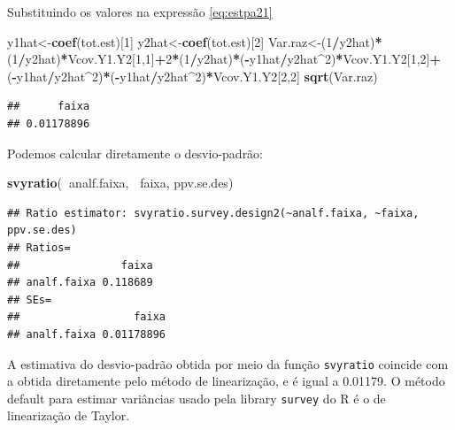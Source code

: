 \documentclass[]{book}
\newenvironment{Shaded}{\begin{snugshade}}{\end{snugshade}}
\newcommand{\KeywordTok}[1]{\textcolor[rgb]{0.13,0.29,0.53}{\textbf{#1}}}
\newcommand{\DecValTok}[1]{\textcolor[rgb]{0.00,0.00,0.81}{#1}}
\newcommand{\OperatorTok}[1]{\textcolor[rgb]{0.81,0.36,0.00}{\textbf{#1}}}
\newcommand{\NormalTok}[1]{#1}
\theoremstyle{definition}
\theoremstyle{definition}
\theoremstyle{definition}
\theoremstyle{remark}
\begin{document}
Substituindo os valores na expressão \eqref{eq:estpa21}

\begin{Shaded}
\begin{Highlighting}[]
\NormalTok{y1hat<-}\KeywordTok{coef}\NormalTok{(tot.est)[}\DecValTok{1}\NormalTok{]}
\NormalTok{y2hat<-}\KeywordTok{coef}\NormalTok{(tot.est)[}\DecValTok{2}\NormalTok{]}
\NormalTok{Var.raz<-(}\DecValTok{1}\OperatorTok{/}\NormalTok{y2hat)}\OperatorTok{*}\NormalTok{(}\DecValTok{1}\OperatorTok{/}\NormalTok{y2hat)}\OperatorTok{*}\NormalTok{Vcov.Y1.Y2[}\DecValTok{1}\NormalTok{,}\DecValTok{1}\NormalTok{]}\OperatorTok{+}\DecValTok{2}\OperatorTok{*}\NormalTok{(}\DecValTok{1}\OperatorTok{/}\NormalTok{y2hat)}\OperatorTok{*}\NormalTok{(}\OperatorTok{-}\NormalTok{y1hat}\OperatorTok{/}\NormalTok{y2hat}\OperatorTok{^}\DecValTok{2}\NormalTok{)}\OperatorTok{*}\NormalTok{Vcov.Y1.Y2[}\DecValTok{1}\NormalTok{,}\DecValTok{2}\NormalTok{]}\OperatorTok{+}
\NormalTok{(}\OperatorTok{-}\NormalTok{y1hat}\OperatorTok{/}\NormalTok{y2hat}\OperatorTok{^}\DecValTok{2}\NormalTok{)}\OperatorTok{*}\NormalTok{(}\OperatorTok{-}\NormalTok{y1hat}\OperatorTok{/}\NormalTok{y2hat}\OperatorTok{^}\DecValTok{2}\NormalTok{)}\OperatorTok{*}\NormalTok{Vcov.Y1.Y2[}\DecValTok{2}\NormalTok{,}\DecValTok{2}\NormalTok{]}
\KeywordTok{sqrt}\NormalTok{(Var.raz)}
\end{Highlighting}
\end{Shaded}

\begin{verbatim}
##      faixa 
## 0.01178896
\end{verbatim}

Podemos calcular diretamente o desvio-padrão:

\begin{Shaded}
\begin{Highlighting}[]
\KeywordTok{svyratio}\NormalTok{(}\OperatorTok{~}\NormalTok{analf.faixa, }\OperatorTok{~}\NormalTok{faixa, ppv.se.des)}
\end{Highlighting}
\end{Shaded}

\begin{verbatim}
## Ratio estimator: svyratio.survey.design2(~analf.faixa, ~faixa, ppv.se.des)
## Ratios=
##                faixa
## analf.faixa 0.118689
## SEs=
##                  faixa
## analf.faixa 0.01178896
\end{verbatim}

A estimativa do desvio-padrão obtida por meio da função
\texttt{svyratio} coincide com a obtida diretamente pelo método de
linearização, e é igual a 0.01179. O método default para estimar
variâncias usado pela library \texttt{survey} \citep{R-survey} do R é o
de linearização de Taylor.
\end{document}
